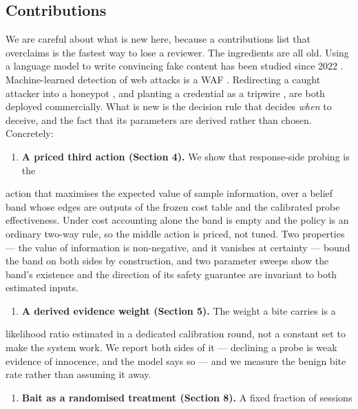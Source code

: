 \subsection{Contributions}

We are careful about what is new here, because a contributions list that overclaims
is the fastest way to lose a reviewer. The ingredients are all old. Using a
language model to write convincing fake content has been studied since 2022
\cite{sladic2024shellm,bridges2025sok,vero2026honeyval}. Machine-learned detection
of web attacks is a WAF \cite{kruegel2003anomaly,tekerek2021novel}. Redirecting a
caught attacker into a honeypot \cite{provos2004honeyd}, and planting a credential
as a tripwire \cite{juels2013honeywords,bowen2009baiting}, are both deployed
commercially. What is new is the decision rule that decides \emph{when} to deceive, and
the fact that its parameters are derived rather than chosen. Concretely:

\begin{enumerate}
 \item \textbf{A priced third action (Section 4).} We show that response-side probing is the
\end{enumerate}

 action that maximises the expected value of sample information, over a belief
 band whose edges are outputs of the frozen cost table and the calibrated probe
 effectiveness. Under cost accounting alone the band is empty and the policy is
 an ordinary two-way rule, so the middle action is priced, not tuned. Two
 properties --- the value of information is non-negative, and it vanishes at
 certainty --- bound the band on both sides by construction, and two parameter
 sweeps show the band's existence and the direction of its safety guarantee are
 invariant to both estimated inputs.

\begin{enumerate}
 \item \textbf{A derived evidence weight (Section 5).} The weight a bite carries is a
\end{enumerate}

 likelihood ratio estimated in a dedicated calibration round, not a constant set
 to make the system work. We report both sides of it --- declining a probe is weak
 evidence of innocence, and the model says so --- and we measure the benign bite
 rate rather than assuming it away.

\begin{enumerate}
 \item \textbf{Bait as a randomised treatment (Section 8).} A fixed fraction of sessions
\end{enumerate}

